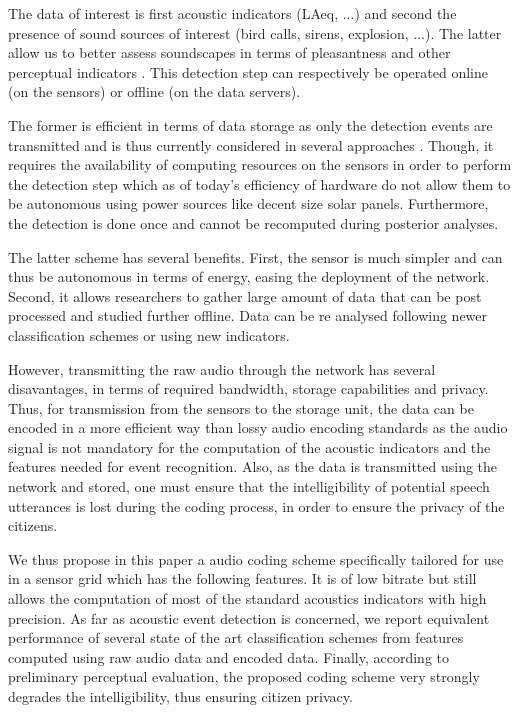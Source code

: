 \documentclass[final,3p,times,twocolumn]{elsarticle}
\begin{document}
The data of interest is first acoustic indicators (LAeq, ...) and second the presence of sound sources of interest (bird calls, sirens, explosion, ...). The latter allow us to better assess soundscapes in terms of pleasantness and other perceptual indicators \cite{lavandier2006contribution, aumond2017modeling}. This detection step can respectively be operated online (on the sensors) or offline (on the data servers).

The former is efficient in terms of data storage as only the detection events are transmitted and is thus currently considered in several approaches \cite{defreville2006automatic, mydlarz2017implementation, mydlarz2015design}. Though, it requires the availability of computing resources on the sensors in order to perform the detection step which as of today's efficiency of hardware do not allow them to be autonomous using power sources like decent size solar panels. Furthermore, the detection is done once and cannot be recomputed during posterior analyses.

The latter scheme has several benefits. First, the sensor is much simpler and can thus be autonomous in terms of energy, easing the deployment of the network. Second, it allows researchers to gather large amount of data that can be post processed and studied further offline. Data can be re analysed following newer classification schemes or using new indicators.

However, transmitting the raw audio through the network has several disavantages, in terms of required bandwidth, storage capabilities and privacy. Thus, for transmission from the sensors to the storage unit, the data can be encoded in a more efficient way than lossy audio encoding standards \cite{pan1995tutorial} as the audio signal is not mandatory for the computation of the acoustic indicators and the features needed for event recognition. Also, as the data is transmitted using the network and stored, one must ensure that the intelligibility of potential speech utterances is lost during the coding process, in order to ensure the privacy of the citizens.

We thus propose in this paper a audio coding scheme specifically tailored for use in a sensor grid which has the following features. It is of low bitrate but still allows the computation of most of the standard acoustics indicators with high precision. As far as acoustic event detection is concerned, we report equivalent performance of several state of the art classification schemes from features computed using raw audio data and encoded data. Finally, according to preliminary perceptual evaluation, the proposed coding scheme very strongly degrades the intelligibility, thus ensuring citizen privacy.
\end{document}
